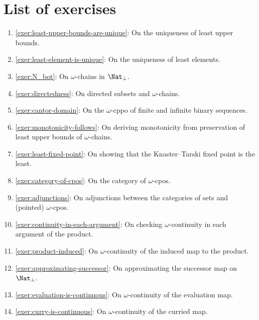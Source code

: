 \section{List of exercises}
\begin{enumerate}
\item \cref{exer:least-upper-bounds-are-unique}: On the uniqueness of least upper bounds.
\item \cref{exer:least-element-is-unique}: On the uniqueness of least elements.
\item \cref{exer:N_bot}: On \(\omega\)-chains in \(\Nat_\bot\).
\item \cref{exer:directedness}: On directed subsets and \(\omega\)-chains.
\item \cref{exer:cantor-domain}: On the \(\omega\)-cppo of finite and infinite
  binary sequences.
\item \cref{exer:monotonicity-follows}: On deriving monotonicity from preservation of
  least upper bounds of \(\omega\)-chains.
\item \cref{exer:least-fixed-point}: On showing that the Knaster--Tarski fixed point
  is the least.
\item \cref{exer:category-of-cpos}: On the category of \(\omega\)-cpos.
\item \cref{exer:adjunctions}: On adjunctions between the categories of sets and
  (pointed) \(\omega\)-cpos.
\item \cref{exer:continuity-in-each-argument}: On checking \(\omega\)-continuity
  in each argument of the product.
\item \cref{exer:product-induced}: On \(\omega\)-continuity of the induced map
  to the product.
\item \cref{exer:approximating-successor}: On approximating the successor map on
  \(\Nat_\bot\).
\item \cref{exer:evaluation-is-continuous}: On \(\omega\)-continuity of the evaluation map.
\item \cref{exer:curry-is-continuous}: On \(\omega\)-continuity of the curried map.
\end{enumerate}

